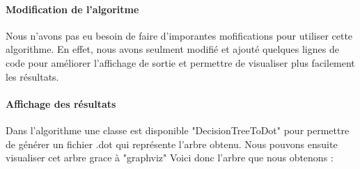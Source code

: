 \paragraph{Modification de l'algoritme}  
Nous n'avons pas eu besoin de faire d'imporantes mofifications pour utiliser cette algorithme. En effet, nous avons seulment modifié et ajouté quelques lignes de code pour améliorer l'affichage de sortie et permettre de visualiser plus facilement les résultats.

\paragraph{Affichage des résultats}
Dans l'algorithme une classe est disponible "DecisionTreeToDot" pour permettre de générer un fichier .dot qui représente l'arbre obtenu. Nous pouvons ensuite visualiser cet arbre grace à "graphviz"
Voici donc l'arbre que nous obtenons :

